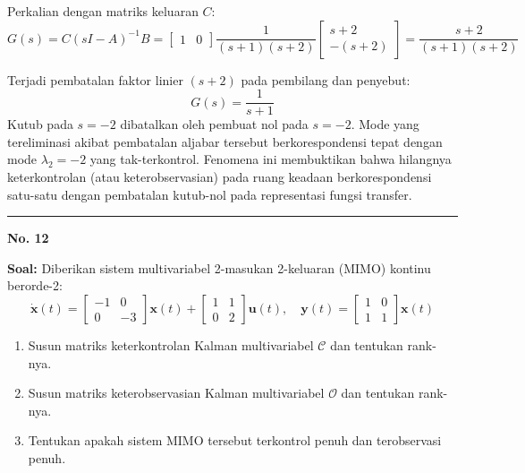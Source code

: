 \documentclass[11pt,a4paper]{article}
\begin{document}
Perkalian dengan matriks keluaran $C$:
$$G(s) = C(sI - A)^{-1} B = \begin{bmatrix} 1 & 0 \end{bmatrix} \frac{1}{(s+1)(s+2)} \begin{bmatrix} s + 2 \\ -(s + 2) \end{bmatrix} = \frac{s + 2}{(s+1)(s+2)}$$

Terjadi pembatalan faktor linier $(s + 2)$ pada pembilang dan penyebut:
$$G(s) = \frac{1}{s + 1}$$
Kutub pada $s = -2$ dibatalkan oleh pembuat nol pada $s = -2$. Mode yang tereliminasi akibat pembatalan aljabar tersebut berkorespondensi tepat dengan mode $\lambda_2 = -2$ yang tak-terkontrol. Fenomena ini membuktikan bahwa hilangnya keterkontrolan (atau keterobservasian) pada ruang keadaan berkorespondensi satu-satu dengan pembatalan kutub-nol pada representasi fungsi transfer.

\vspace{12pt}
\hrule
\vspace{10pt}

\textbf{\large No. 12}

\textbf{Soal:}  
Diberikan sistem multivariabel 2-masukan 2-keluaran (MIMO) kontinu berorde-2:
$$\dot{\mathbf{x}}(t) = \begin{bmatrix} -1 & 0 \\ 0 & -3 \end{bmatrix} \mathbf{x}(t) + \begin{bmatrix} 1 & 1 \\ 0 & 2 \end{bmatrix} \mathbf{u}(t), \quad \mathbf{y}(t) = \begin{bmatrix} 1 & 0 \\ 1 & 1 \end{bmatrix} \mathbf{x}(t)$$
\begin{enumerate}[label=(\alph*)]
    \item Susun matriks keterkontrolan Kalman multivariabel $\mathcal{C}$ dan tentukan rank-nya.
    \item Susun matriks keterobservasian Kalman multivariabel $\mathcal{O}$ dan tentukan rank-nya.
    \item Tentukan apakah sistem MIMO tersebut terkontrol penuh dan terobservasi penuh.
\end{enumerate}
\end{document}
